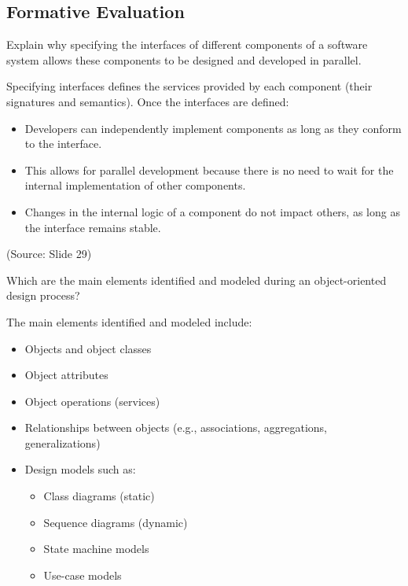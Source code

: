 \documentclass[12pt]{article}
\begin{document}
\subsection{Formative Evaluation}

\begin{questionbox}
Explain why specifying the interfaces of different components of a software system allows these components to be designed and developed in parallel.
\end{questionbox}

Specifying interfaces defines the services provided by each component (their signatures and semantics). Once the interfaces are defined:
\begin{itemize}
    \item Developers can independently implement components as long as they conform to the interface.
    \item This allows for parallel development because there is no need to wait for the internal implementation of other components.
    \item Changes in the internal logic of a component do not impact others, as long as the interface remains stable.
\end{itemize}

(Source: Slide 29)

\begin{questionbox}
Which are the main elements identified and modeled during an object-oriented design process?
\end{questionbox}

The main elements identified and modeled include:
\begin{itemize}
    \item Objects and object classes
    \item Object attributes
    \item Object operations (services)
    \item Relationships between objects (e.g., associations, aggregations, generalizations)
    \item Design models such as:
    \begin{itemize}
        \item Class diagrams (static)
        \item Sequence diagrams (dynamic)
        \item State machine models
        \item Use-case models
    \end{itemize}
\end{itemize}
\end{document}
